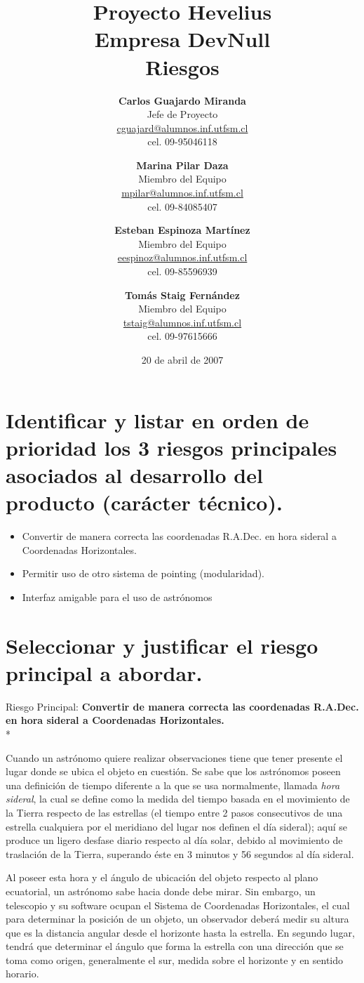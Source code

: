\documentclass[letterpaper,spanish,10pt]{article}
\title{{\Huge \bf Proyecto Hevelius} \\ {\Large Empresa DevNull} \\ {\small Riesgos}}
\author{
{\bf Carlos Guajardo Miranda} \\ Jefe de Proyecto \\ \url{cguajard@alumnos.inf.utfsm.cl} \\ cel. 09-95046118 
\and
{\bf Marina Pilar Daza} \\ Miembro del Equipo \\ \url{mpilar@alumnos.inf.utfsm.cl} \\ cel. 09-84085407
\and
{\bf Esteban Espinoza Mart\'inez} \\ Miembro del Equipo \\ \url{eespinoz@alumnos.inf.utfsm.cl} \\ cel. 09-85596939
\and
{\bf Tom\'as Staig Fern\'andez} \\ Miembro del Equipo \\ \url{tstaig@alumnos.inf.utfsm.cl} \\ cel. 09-97615666
}
\date{20 de abril de 2007}
\begin{document}
\maketitle


%
%
\newpage

\section{Identificar y listar en orden de prioridad los 3 riesgos principales asociados al desarrollo del producto (car\'acter t\'ecnico).}

\begin{itemize}
	\item Convertir de manera correcta las coordenadas R.A.Dec. en hora sideral a Coordenadas Horizontales.
	\item Permitir uso de otro sistema de pointing (modularidad).
	\item Interfaz amigable para el uso de astr\'onomos
\end{itemize}


\section{Seleccionar y justificar el riesgo principal a abordar.}

Riesgo Principal: \textbf{Convertir de manera correcta las coordenadas R.A.Dec. en hora sideral a Coordenadas Horizontales.}\\*

Cuando un astr\'onomo quiere realizar observaciones tiene que tener presente el lugar donde se ubica el objeto en cuesti\'on.
Se sabe que los astr\'onomos poseen una definici\'on de tiempo diferente a la que se usa normalmente, llamada \textit{hora sideral},
la cual se define como la medida del tiempo basada en el movimiento de la Tierra respecto de las estrellas (el tiempo entre 2 
pasos consecutivos de una estrella cualquiera por el meridiano del lugar nos definen el d\'ia sideral); aqu\'i se produce un 
ligero desfase diario respecto al d\'ia solar, debido al movimiento de traslaci\'on de la Tierra, superando \'este en 3 minutos 
y 56 segundos al d\'ia sideral.

Al poseer esta hora y el \'angulo de ubicaci\'on del objeto respecto al plano ecuatorial, un astr\'onomo sabe hacia donde debe mirar. 
Sin embargo, un telescopio y su software ocupan el Sistema de Coordenadas Horizontales, el cual para determinar la posici\'on de 
un objeto, un observador deber\'a medir su altura que es la distancia angular desde el horizonte hasta la estrella. En segundo lugar, 
tendr\'a que determinar el \'angulo que forma la estrella con una direcci\'on que se toma como origen, generalmente el sur, medida 
sobre el horizonte y en sentido horario.
\end{document}
